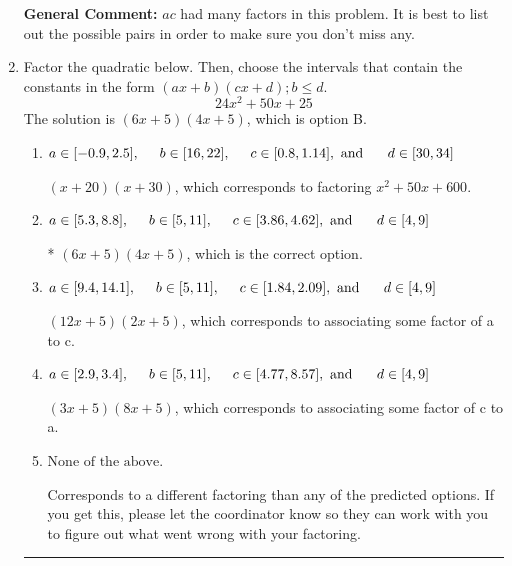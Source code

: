 \documentclass{extbook}[14pt]
\newcommand{\litem}[1]{\item #1

\rule{\textwidth}{0.4pt}}
\begin{document}
\begin{enumerate}
{\textbf{General Comment:} $ac$ had many factors in this problem. It is best to list out the possible pairs in order to make sure you don't miss any.
}
\litem{
Factor the quadratic below. Then, choose the intervals that contain the constants in the form $(ax+b)(cx+d); b \leq d.$
\[ 24x^{2} +50 x + 25 \]The solution is \( (6x + 5)(4x + 5) \), which is option B.\begin{enumerate}[label=\Alph*.]
\item \( a \in [-0.9, 2.5], \hspace*{5mm} b \in [16, 22], \hspace*{5mm} c \in [0.8, 1.14], \text{ and } \hspace*{5mm} d \in [30, 34] \)

 $(x + 20)(x + 30)$, which corresponds to factoring $x^{2} +50 x + 600$.
\item \( a \in [5.3, 8.8], \hspace*{5mm} b \in [5, 11], \hspace*{5mm} c \in [3.86, 4.62], \text{ and } \hspace*{5mm} d \in [4, 9] \)

* $(6x + 5)(4x + 5)$, which is the correct option.
\item \( a \in [9.4, 14.1], \hspace*{5mm} b \in [5, 11], \hspace*{5mm} c \in [1.84, 2.09], \text{ and } \hspace*{5mm} d \in [4, 9] \)

 $(12x + 5)(2x + 5)$, which corresponds to associating some factor of a to c.
\item \( a \in [2.9, 3.4], \hspace*{5mm} b \in [5, 11], \hspace*{5mm} c \in [4.77, 8.57], \text{ and } \hspace*{5mm} d \in [4, 9] \)

 $(3x + 5)(8x + 5)$, which corresponds to associating some factor of c to a.
\item \( \text{None of the above.} \)

 Corresponds to a different factoring than any of the predicted options. If you get this, please let the coordinator know so they can work with you to figure out what went wrong with your factoring.
\end{enumerate}

}
\end{enumerate}
\end{document}
